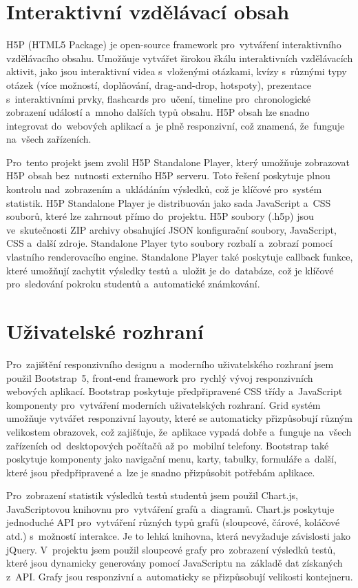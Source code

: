 \documentclass[12pt, a4paper,
twoside,
openany
]{report}
\begin{document}
	\section{Interaktivní vzdělávací obsah}
	
	H5P (HTML5 Package) je open-source framework pro~vytváření interaktivního vzdělávacího obsahu. Umožňuje vytvářet širokou škálu interaktivních vzdělávacích aktivit, jako jsou interaktivní videa s~vloženými otázkami, kvízy s~různými typy otázek (více možností, doplňování, drag-and-drop, hotspoty), prezentace s~interaktivními prvky, flashcards pro~učení, timeline pro~chronologické zobrazení událostí a~mnoho dalších typů obsahu. H5P obsah lze snadno integrovat do~webových aplikací a~je plně responzivní, což znamená, že~funguje na~všech zařízeních.
	
	Pro~tento projekt jsem zvolil H5P Standalone Player, který umožňuje zobrazovat H5P obsah bez~nutnosti externího H5P serveru. Toto řešení poskytuje plnou kontrolu nad~zobrazením a~ukládáním výsledků, což je klíčové pro~systém statistik. H5P Standalone Player je distribuován jako sada JavaScript a~CSS souborů, které lze zahrnout přímo do~projektu. H5P soubory (.h5p) jsou ve~skutečnosti ZIP archivy obsahující JSON konfigurační soubory, JavaScript, CSS a~další zdroje. Standalone Player tyto soubory rozbalí a~zobrazí pomocí vlastního renderovacího engine. Standalone Player také poskytuje callback funkce, které umožňují zachytit výsledky testů a~uložit je do~databáze, což je klíčové pro~sledování pokroku studentů a~automatické známkování.

	\section{Uživatelské rozhraní}
	
	Pro~zajištění responzivního designu a~moderního uživatelského rozhraní jsem použil Bootstrap~5, front-end framework pro~rychlý vývoj responzivních webových aplikací. Bootstrap poskytuje předpřipravené CSS třídy a~JavaScript komponenty pro~vytváření moderních uživatelských rozhraní. Grid systém umožňuje vytvářet responzivní layouty, které se automaticky přizpůsobují různým velikostem obrazovek, což zajišťuje, že~aplikace vypadá dobře a~funguje na~všech zařízeních od~desktopových počítačů až po~mobilní telefony. Bootstrap také poskytuje komponenty jako navigační menu, karty, tabulky, formuláře a~další, které jsou předpřipravené a~lze je snadno přizpůsobit potřebám aplikace.
	
	Pro~zobrazení statistik výsledků testů studentů jsem použil Chart.js, JavaScriptovou knihovnu pro~vytváření grafů a~diagramů. Chart.js poskytuje jednoduché API pro~vytváření různých typů grafů (sloupcové, čárové, koláčové atd.) s~možností interakce. Je to lehká knihovna, která nevyžaduje závislosti jako jQuery. V~projektu jsem použil sloupcové grafy pro~zobrazení výsledků testů, které jsou dynamicky generovány pomocí JavaScriptu na~základě dat získaných z~API. Grafy jsou responzivní a~automaticky se přizpůsobují velikosti kontejneru.
\end{document}
